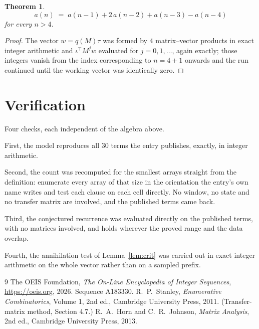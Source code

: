 \documentclass[11pt,a4paper]{article}
\theoremstyle{plain}
\newtheorem{theorem}{Theorem}
\theoremstyle{definition}
\begin{document}
\begin{theorem}
\[
a(n)\;=\;a(n-1) + 2\,a(n-2) + a(n-3) - a(n-4)
\]
for every $n>4$.
\end{theorem}

\begin{proof}
The vector $w=q(M)\tau$ was formed by $4$ matrix--vector products in exact integer
arithmetic and $\iota^{\!\top}M^{j}w$ evaluated for $j=0,1,\dots$, again exactly; those
integers vanish from the index corresponding to $n=4+1$ onwards and the run continued
until the working vector was identically zero.
\end{proof}

\section{Verification}

Four checks, each independent of the algebra above.

First, the model reproduces all $30$ terms the entry publishes, exactly, in integer
arithmetic.

Second, the count was recomputed for the smallest arrays straight from the definition:
enumerate every array of that size in the orientation the entry's own name writes and test each
clause on each cell directly. No window, no state and no transfer matrix are involved, and the
published terms came back.

Third, the conjectured recurrence was evaluated directly on the published terms, with no
matrices involved, and holds wherever the proved range and the data overlap.

Fourth, the annihilation test of Lemma~\ref{lem:crit} was carried out in exact integer
arithmetic on the whole vector rather than on a sampled prefix.

\begin{thebibliography}{9}
 The OEIS Foundation, \emph{The On-Line Encyclopedia of Integer
Sequences}, \url{https://oeis.org}, 2026. Sequence A183330.
 R.~P.~Stanley, \emph{Enumerative Combinatorics}, Volume 1, 2nd ed.,
Cambridge University Press, 2011. (Transfer-matrix method, Section 4.7.)
 R.~A.~Horn and C.~R.~Johnson, \emph{Matrix Analysis}, 2nd ed., Cambridge
University Press, 2013.
\end{thebibliography}
\end{document}
